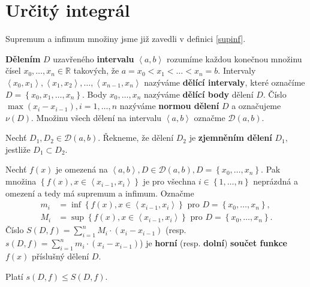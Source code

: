 \section{Určitý integrál}
\begin{pozn}
    Supremum a infimum množiny jsme již zavedli v definici \ref{supinf}.
\end{pozn}

\begin{definition}
\textbf{Dělením} $D$ uzavřeného \textbf{intervalu} $\left < a,b \right > $
rozumíme každou konečnou množinu čísel $x_0,\dots,x_n \in \mathbb R$ takových, že
$a=x_0<x_1<\dots<x_n=b.$ Intervaly $\left < x_0, x_1 \right > ,
\left < x_1, x_2 \right >, \dots, \left < x_{n-1}, x_n \right >  $ nazýváme
\textbf{dělící intervaly}, které označíme $D=\left \{ x_0,x_1,\dots,x_n \right \} .$
Body $x_0,\dots,x_n$ nazýváme \textbf{dělící body} dělení $D$. Číslo
$\max \left ( x_i-x_{i-1} \right ), i=1,\dots,n $ nazýváme \textbf{normou dělení}
$D$ a označujeme $\nu(D).$ Množinu všech dělení na intervalu $\left < a,b \right > $
označme $\mathscr D(a,b).$
\end{definition}

\begin{definition}
Nechť $D_1, D_2 \in \mathscr D(a,b)$. Řekneme, že dělení $D_2$ je \textbf{zjemněním
dělení} $D_1,$ jestliže $D_1 \subset D_2.$
\end{definition}

\begin{definition}
Nechť $f(x)$ je omezená na $\left < a,b \right > , D\in \mathscr D(a,b),
D=\left \{ x_0,\dots,x_n \right \}. $ Pak množina $\left \{ f(x),
x \in \left < x_{i-1},x_i \right >  \right \} $ je pro všechna $i \in \left \{
1,\dots,n\right \} $ neprázdná a omezení a tedy má supremum a infimum.
Označme
\begin{align*}
    m_i &= \inf \left \{ f(x), x \in \left < x_{i-1},x_i \right >  \right \} \textrm{ pro } D=\left \{ x_0,\dots,x_n \right \},\\
    M_i &=   \sup \left \{ f(x), x \in \left < x_{i-1},x_i \right >  \right \} \textrm{ pro } D=\left \{ x_0,\dots,x_n \right \}.
\end{align*}
Číslo $S(D,f)=\sum_{i=1}^n M_i\cdot (x_i-x_{i-1})$
(resp. $s(D,f)=\sum_{i=1}^n m_i\cdot (x_i-x_{i-1})$) je \textbf{horní} (resp. \textbf{dolní}) \textbf{součet funkce}
$f(x)$ příslušný dělení $D$.
\end{definition}

\begin{pozn}
    Platí $s(D,f)\leq S(D,f).$
\end{pozn}

